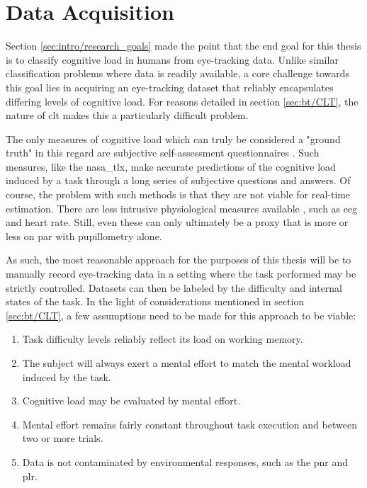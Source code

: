 \section{Data Acquisition} \label{sec:impl/data_acq}

Section \ref{sec:intro/research_goals} made the point that the end goal for this thesis is to classify cognitive load in humans from eye-tracking data. Unlike similar classification problems where data is readily available, a core challenge towards this goal lies in acquiring an eye-tracking dataset that reliably encapsulates differing levels of cognitive load. For reasons detailed in section \ref{sec:bt/CLT}, the nature of \acrshort{clt} makes this a particularly difficult problem. 

The only measures of cognitive load which can truly be considered a "ground truth" in this regard are subjective self-assessment questionnaires \cite{sharma2020, herbig2020}. Such measures, like the \acrshort{nasa_tlx}, make accurate predictions of the cognitive load induced by a task through a long series of subjective questions and answers. Of course, the problem with such methods is that they are not viable for real-time estimation. There are less intrusive physiological measures available \cite{skulmowski2017}, such as \acrshort{eeg} and heart rate. Still, even these can only ultimately be a proxy that is more or less on par with pupillometry alone.

As such, the most reasonable approach for the purposes of this thesis will be to manually record eye-tracking data in a setting where the task performed may be strictly controlled. Datasets can then be labeled by the difficulty and internal states of the task. In the light of considerations mentioned in section \ref{sec:bt/CLT}, a few assumptions need to be made for this approach to be viable:

\begin{enumerate}
    \item Task difficulty levels reliably reflect its load on working memory. \label{itm:Ass1}
    \item The subject will always exert a mental effort to match the mental workload induced by the task. \label{itm:Ass2}
    \item Cognitive load may be evaluated by mental effort. \label{itm:Ass3}
    \item Mental effort remains fairly constant throughout task execution and between two or more trials. \label{itm:Ass4}
    \item Data is not contaminated by environmental responses, such as the \acrshort{pnr} and \acrshort{plr}. \label{itm:Ass5}
\end{enumerate}

